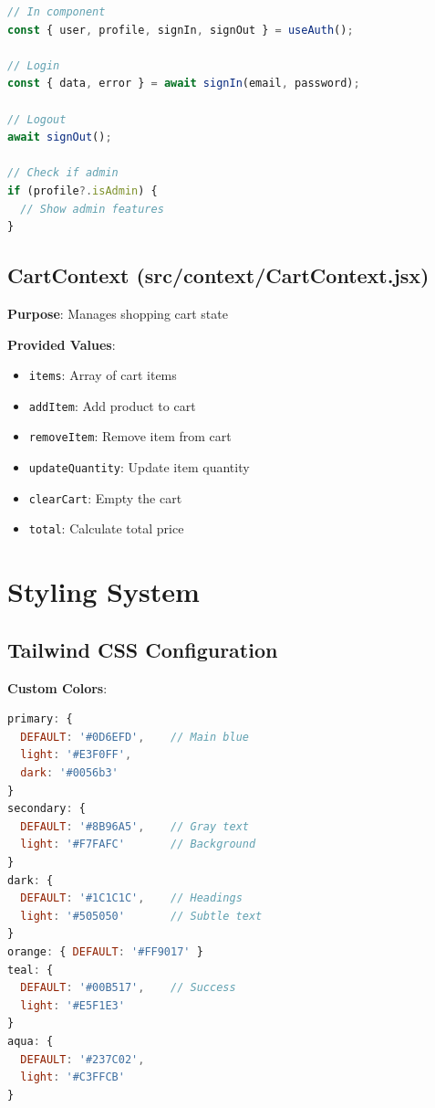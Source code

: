 \documentclass[12pt,a4paper]{report}
\begin{document}
\begin{lstlisting}[language=javascript, caption=AuthContext Usage]
// In component
const { user, profile, signIn, signOut } = useAuth();

// Login
const { data, error } = await signIn(email, password);

// Logout
await signOut();

// Check if admin
if (profile?.isAdmin) {
  // Show admin features
}
\end{lstlisting}

\subsection{CartContext (src/context/CartContext.jsx)}

\textbf{Purpose}: Manages shopping cart state

\textbf{Provided Values}:
\begin{itemize}
    \item \texttt{items}: Array of cart items
    \item \texttt{addItem}: Add product to cart
    \item \texttt{removeItem}: Remove item from cart
    \item \texttt{updateQuantity}: Update item quantity
    \item \texttt{clearCart}: Empty the cart
    \item \texttt{total}: Calculate total price
\end{itemize}

\section{Styling System}

\subsection{Tailwind CSS Configuration}

\textbf{Custom Colors}:
\begin{lstlisting}[language=javascript, caption=Color Palette]
primary: {
  DEFAULT: '#0D6EFD',    // Main blue
  light: '#E3F0FF',
  dark: '#0056b3'
}
secondary: {
  DEFAULT: '#8B96A5',    // Gray text
  light: '#F7FAFC'       // Background
}
dark: {
  DEFAULT: '#1C1C1C',    // Headings
  light: '#505050'       // Subtle text
}
orange: { DEFAULT: '#FF9017' }
teal: { 
  DEFAULT: '#00B517',    // Success
  light: '#E5F1E3'
}
aqua: {
  DEFAULT: '#237C02',
  light: '#C3FFCB'
}
\end{lstlisting}
\end{document}
